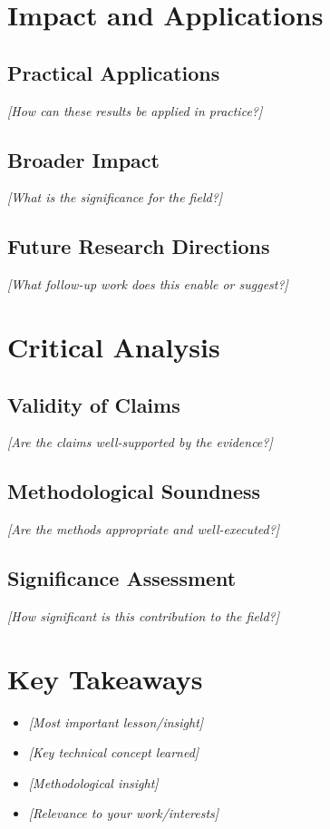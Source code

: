 \documentclass[11pt]{article}
\begin{document}
	\section{Impact and Applications}
	\subsection{Practical Applications}
	\textit{[How can these results be applied in practice?]}
	
	\subsection{Broader Impact}
	\textit{[What is the significance for the field?]}
	
	\subsection{Future Research Directions}
	\textit{[What follow-up work does this enable or suggest?]}
	
	\section{Critical Analysis}
	\subsection{Validity of Claims}
	\textit{[Are the claims well-supported by the evidence?]}
	
	\subsection{Methodological Soundness}
	\textit{[Are the methods appropriate and well-executed?]}
	
	\subsection{Significance Assessment}
	\textit{[How significant is this contribution to the field?]}
	
	\section{Key Takeaways}
	\begin{itemize}
		\item \textit{[Most important lesson/insight]}
		\item \textit{[Key technical concept learned]}
		\item \textit{[Methodological insight]}
		\item \textit{[Relevance to your work/interests]}
	\end{itemize}
	
\end{document}
